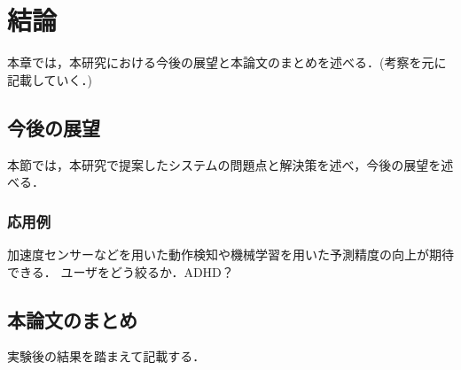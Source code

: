 \chapter{結論}
本章では，本研究における今後の展望と本論文のまとめを述べる．(考察を元に記載していく．)
\section{今後の展望}
本節では，本研究で提案したシステムの問題点と解決策を述べ，今後の展望を述べる．

\subsection{応用例}
加速度センサーなどを用いた動作検知や機械学習を用いた予測精度の向上が期待できる．
ユーザをどう絞るか．ADHD？
\section{本論文のまとめ}
実験後の結果を踏まえて記載する．